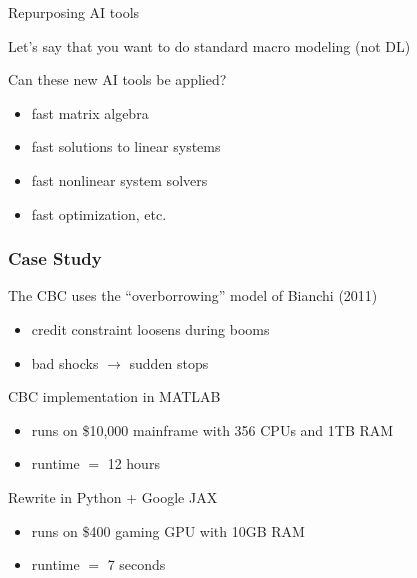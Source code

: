 \begin{frame}{Repurposing AI tools}
    
    Let's say that you want to do standard macro modeling (not DL)

    \vspace{0.5em}
    Can these new AI tools be applied?

    \pause

    \vspace{0.5em}
    \vspace{0.5em}

    \begin{itemize}
        \item fast matrix algebra
        \vspace{0.5em}
        \item fast solutions to linear systems
        \vspace{0.5em}
        \item fast nonlinear system solvers
        \vspace{0.5em}
        \item fast optimization, etc.
    \end{itemize}

\end{frame}



\begin{frame}
    \frametitle{Case Study}

    The CBC uses the ``overborrowing'' model of Bianchi (2011)

    \begin{itemize}
        \item credit constraint loosens during booms
        \item bad shocks $\to$ sudden stops
    \end{itemize}

    \vspace{0.5em}
    CBC implementation in MATLAB 

    \begin{itemize}
        \item runs on \$10,000 mainframe with 356 CPUs and 1TB RAM
        \item runtime $=$ 12 hours
    \end{itemize}

    \pause
    \vspace{0.5em}
    Rewrite in Python + Google JAX

    \begin{itemize}
        \item runs on \$400 gaming GPU with 10GB RAM
        \item runtime $=$ 7 seconds
    \end{itemize}


\end{frame}


